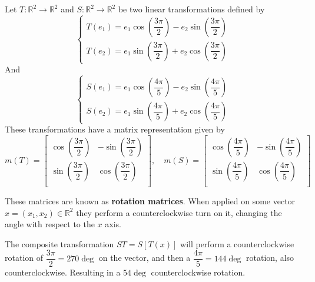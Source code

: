 \documentclass[../linear-spaces.tex]{subfiles}
\begin{document}
\begin{example}
    Let $T: \mathbb{R}^{2} \to \mathbb{R}^{2}$ and $S: \mathbb{R}^{2} \to \mathbb{R}^{2}$ be two linear
    transformations defined by
    \begin{equation*}
        \begin{cases}
            T(e_1) = e_1 \cos\left(\dfrac{3 \pi}{2}\right) - e_2 \sin\left(\dfrac{3 \pi}{2}\right) \\
            T(e_2) = e_1 \sin\left(\dfrac{3 \pi}{2}\right) + e_2 \cos\left(\dfrac{3 \pi}{2}\right)
        \end{cases}
    \end{equation*}
    And
    \begin{equation*}
        \begin{cases}
            S(e_1) = e_1 \cos\left(\dfrac{4 \pi}{5}\right) - e_2 \sin\left(\dfrac{4 \pi}{5}\right) \\
            S(e_2) = e_1 \sin\left(\dfrac{4 \pi}{5}\right) + e_2 \cos\left(\dfrac{4 \pi}{5}\right)
        \end{cases}
    \end{equation*}
    These transformations have a matrix representation given by
    \begin{equation*}
        m(T)=\left[\begin{matrix}
                \cos\left(\dfrac{3 \pi}{2}\right) & - \sin\left(\dfrac{3 \pi}{2}\right) \\[1.5em]
                \sin\left(\dfrac{3 \pi}{2}\right) & \cos\left(\dfrac{3 \pi}{2}\right)   \\
            \end{matrix}\right],\quad
        m(S)=\left[\begin{matrix}
                \cos\left(\dfrac{4 \pi}{5}\right) & - \sin\left(\dfrac{4 \pi}{5}\right) \\[1.5em]
                \sin\left(\dfrac{4 \pi}{5}\right) & \cos\left(\dfrac{4 \pi}{5}\right)   \\
            \end{matrix}\right]
    \end{equation*}

    These matrices are known as \textbf{rotation matrices}. When applied on some
    vector $x = \left(x_1,x_2\right)\in\mathbb{R}^{2}$ they perform a
    counterclockwise turn on it, changing the angle with respect to the $x$ axis.

    The composite transformation $ST = S\left[T(x)\right]$ will perform a
    counterclockwise rotation of $\dfrac{3\pi}{2} = 270\deg$ on the vector, and
    then a $\dfrac{4\pi}{5} = 144\deg$ rotation, also counterclockwise. Resulting
    in a $54\deg$ counterclockwise rotation.


\end{example}
\end{document}
